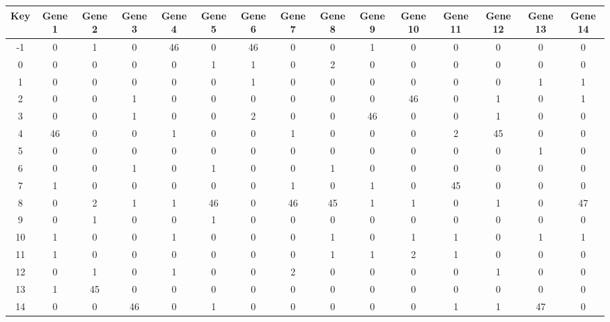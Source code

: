 \begin{tabular}{|c|c|c|c|c|c|c|c|c|c|c|c|c|c|c|}
\hline
Key & Gene 1 & Gene 2 & Gene 3 & Gene 4 & Gene 5 & Gene 6 & Gene 7 & Gene 8 & Gene 9 & Gene 10 & Gene 11 & Gene 12 & Gene 13 & Gene 14 \\
\hline
-1 & 0 & 1 & 0 & 46 & 0 & 46 & 0 & 0 & 1 & 0 & 0 & 0 & 0 & 0 \\
0 & 0 & 0 & 0 & 0 & 1 & 1 & 0 & 2 & 0 & 0 & 0 & 0 & 0 & 0 \\
1 & 0 & 0 & 0 & 0 & 0 & 1 & 0 & 0 & 0 & 0 & 0 & 0 & 1 & 1 \\
2 & 0 & 0 & 1 & 0 & 0 & 0 & 0 & 0 & 0 & 46 & 0 & 1 & 0 & 1 \\
3 & 0 & 0 & 1 & 0 & 0 & 2 & 0 & 0 & 46 & 0 & 0 & 1 & 0 & 0 \\
4 & 46 & 0 & 0 & 1 & 0 & 0 & 1 & 0 & 0 & 0 & 2 & 45 & 0 & 0 \\
5 & 0 & 0 & 0 & 0 & 0 & 0 & 0 & 0 & 0 & 0 & 0 & 0 & 1 & 0 \\
6 & 0 & 0 & 1 & 0 & 1 & 0 & 0 & 1 & 0 & 0 & 0 & 0 & 0 & 0 \\
7 & 1 & 0 & 0 & 0 & 0 & 0 & 1 & 0 & 1 & 0 & 45 & 0 & 0 & 0 \\
8 & 0 & 2 & 1 & 1 & 46 & 0 & 46 & 45 & 1 & 1 & 0 & 1 & 0 & 47 \\
9 & 0 & 1 & 0 & 0 & 1 & 0 & 0 & 0 & 0 & 0 & 0 & 0 & 0 & 0 \\
10 & 1 & 0 & 0 & 1 & 0 & 0 & 0 & 1 & 0 & 1 & 1 & 0 & 1 & 1 \\
11 & 1 & 0 & 0 & 0 & 0 & 0 & 0 & 1 & 1 & 2 & 1 & 0 & 0 & 0 \\
12 & 0 & 1 & 0 & 1 & 0 & 0 & 2 & 0 & 0 & 0 & 0 & 1 & 0 & 0 \\
13 & 1 & 45 & 0 & 0 & 0 & 0 & 0 & 0 & 0 & 0 & 0 & 0 & 0 & 0 \\
14 & 0 & 0 & 46 & 0 & 1 & 0 & 0 & 0 & 0 & 0 & 1 & 1 & 47 & 0 \\
\hline
\end{tabular}